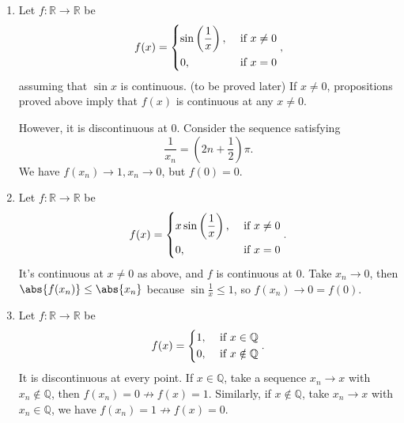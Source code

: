 \begin{example}
    \leavevmode
    \begin{enumerate}
        \item Let \(f: \mathbb{R}\to \mathbb{R}\) be
        \[
            f(x) = \begin{dcases}
                \sin \left(\frac{1}{x}\right), &\text{ if } x\neq 0\\
                0, &\text{ if } x = 0\\
            \end{dcases},
        \]
        assuming that \(\sin x\) is continuous. (to be proved later) If \(x\neq 0\), propositions proved above imply that \(f(x)\) is continuous at any \(x \neq 0\).

        However, it is discontinuous at \(0\). Consider the sequence satisfying
        \[\frac{1}{x_n} = (2n + \frac{1}{2})\pi.\]
        We have \(f(x_n) \to 1, x_n \to 0\), but \(f(0)= 0\).
        \item Let \(f: \mathbb{R}\to \mathbb{R}\) be
        \[
            f(x) = \begin{dcases}
                x \sin\left(\frac{1}{x}\right), &\text{ if } x\neq 0\\
                0, &\text{ if } x = 0\\
            \end{dcases}.
        \]
        It's continuous at \(x\neq 0\) as above, and \(f\) is continuous at \(0\). Take \(x_n \to 0\), then \(\abs{f(x_n)} \leq \abs{x_n} \) because \(\sin \frac{1}{x} \leq 1\), so \(f(x_n) \to 0 = f(0)\).
        \item Let \(f: \mathbb{R}\to \mathbb{R}\) be
        \[
            f(x) = \begin{dcases}
                1, &\text{ if } x \in \mathbb{Q}\\
                0, &\text{ if } x \notin \mathbb{Q}\\
            \end{dcases}.
        \]
        It is discontinuous at every point. If \(x \in \mathbb{Q}\), take a sequence \(x_n \to x\) with \(x_n \notin \mathbb{Q}\), then \(f(x_n) = 0 \not \to f(x) = 1\). Similarly, if \(x \notin \mathbb{Q}\), take \(x_n \to x\) with \(x_n \in \mathbb{Q}\), we have \(f(x_n) = 1 \not \to f(x) = 0\).
    \end{enumerate}
\end{example}
